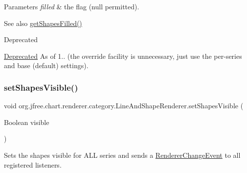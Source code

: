 \begin{DoxyParams}{Parameters}
{\em filled} & the flag ({\ttfamily null} permitted).\\
\hline
\end{DoxyParams}
\begin{DoxySeeAlso}{See also}
\mbox{\hyperlink{classorg_1_1jfree_1_1chart_1_1renderer_1_1category_1_1_line_and_shape_renderer_a23e8590957112ba46cca634918b3ca3d}{get\+Shapes\+Filled()}}
\end{DoxySeeAlso}
\begin{DoxyRefDesc}{Deprecated}
\item[\mbox{\hyperlink{deprecated__deprecated000194}{Deprecated}}]As of 1.. (the override facility is unnecessary, just use the per-\/series and base (default) settings). \end{DoxyRefDesc}
\mbox{\label{classorg_1_1jfree_1_1chart_1_1renderer_1_1category_1_1_line_and_shape_renderer_a478523c511be1a42589ca7ada236d335}} 
\subsubsection{\texorpdfstring{set\+Shapes\+Visible()}{setShapesVisible()}\hspace{0.1cm}{\footnotesize\ttfamily [1/2]}}
{\footnotesize\ttfamily void org.\+jfree.\+chart.\+renderer.\+category.\+Line\+And\+Shape\+Renderer.\+set\+Shapes\+Visible (\begin{DoxyParamCaption}\item[{Boolean}]{visible }\end{DoxyParamCaption})}

Sets the \textquotesingle{}shapes visible\textquotesingle{} for A\+LL series and sends a \mbox{\hyperlink{}{Renderer\+Change\+Event}} to all registered listeners.


